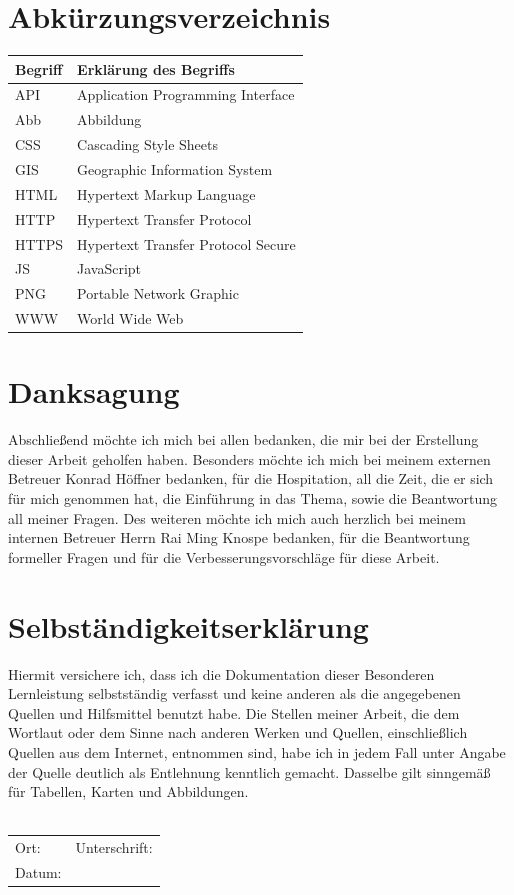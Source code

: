 \documentclass[a4paper, 12pt]{scrreprt}
\begin{document}
\chapter*{Abkürzungsverzeichnis}
\begin{tabularx}{\textwidth}{lX}
\toprule
\textrm{Begriff}                &\textrm{Erklärung des Begriffs}\\
\midrule
API		&Application Programming Interface\\
Abb		&Abbildung\\
CSS		&Cascading Style Sheets\\
GIS		&Geographic Information System \\
HTML	&Hypertext Markup Language\\
HTTP	&Hypertext Transfer Protocol\\
HTTPS	&Hypertext Transfer Protocol Secure\\
JS		&JavaScript\\
PNG		&Portable Network Graphic\\
WWW		&World Wide Web\\

\bottomrule
\end{tabularx}


\listoffigures
{}
\chapter*{Danksagung}
Abschließend möchte ich mich bei allen bedanken, die mir bei der Erstellung dieser Arbeit geholfen haben.
Besonders möchte ich mich bei meinem externen Betreuer Konrad Höffner bedanken, für die Hospitation, all die Zeit, die er sich für mich genommen hat, die Einführung in das Thema, sowie die Beantwortung all meiner Fragen.   
Des weiteren möchte ich mich auch herzlich bei meinem internen Betreuer Herrn Rai Ming Knospe bedanken, für die Beantwortung formeller Fragen und für die Verbesserungsvorschläge für diese Arbeit.
\chapter*{Selbständigkeitserklärung}
Hiermit versichere ich, dass ich die Dokumentation dieser Besonderen Lernleistung selbstständig verfasst und keine anderen als die angegebenen Quellen und Hilfsmittel benutzt habe.
Die Stellen meiner Arbeit, die dem Wortlaut oder dem Sinne nach anderen Werken und Quellen, einschließlich Quellen aus dem Internet, entnommen sind, habe ich in jedem Fall unter Angabe der Quelle deutlich als Entlehnung kenntlich gemacht.
Dasselbe gilt sinngemäß für Tabellen, Karten und Abbildungen.\\\\
\begin{tabularx}{\textwidth}{X X }
Ort: & Unterschrift:\\
Datum:\\
\end{tabularx}
\end{document}
